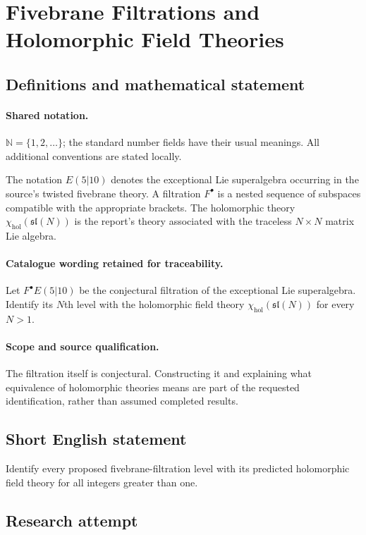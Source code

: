 \documentclass[11pt]{article}
\begin{document}
\section{Fivebrane Filtrations and Holomorphic Field Theories}\label{statement}

\subsection{Definitions and mathematical statement}

\paragraph{Shared notation.}$\mathbb N=\{1,2,\ldots\}$; the standard number fields have their usual meanings. All additional conventions are stated locally.


The notation $E(5|10)$ denotes the exceptional Lie superalgebra occurring in the source's twisted fivebrane theory. A filtration $F^\bullet$ is a nested sequence of subspaces compatible with the appropriate brackets. The holomorphic theory $\chi_{\mathrm{hol}}(\mathfrak{sl}(N))$ is the report's theory associated with the traceless $N\times N$ matrix Lie algebra.

\paragraph{Catalogue wording retained for traceability.}
Let $F^\bullet E(5|10)$ be the conjectural filtration of the exceptional Lie superalgebra. Identify its $N$th level with the holomorphic field theory $\chi_{\mathrm{hol}}(\mathfrak{sl}(N))$ for every $N>1$.

\paragraph{Scope and source qualification.}The filtration itself is conjectural. Constructing it and explaining what equivalence of holomorphic theories means are part of the requested identification, rather than assumed completed results.
\subsection{Short English statement}
Identify every proposed fivebrane-filtration level with its predicted holomorphic field theory for all integers greater than one.
\subsection{Research attempt}
\end{document}
